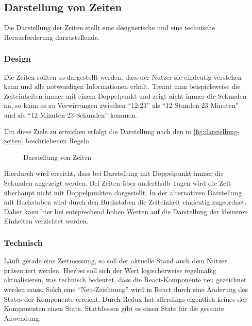 \newpage

\subsection{Darstellung von Zeiten}
Die Darstellung der Zeiten stellt eine designerische und eine technische Herausforderung darzustellende.

\subsubsection{Design}
Die Zeiten sollten so dargestellt werden,
dass der Nutzer sie eindeutig verstehen kann und alle notwendigen Informationen erhält.
Trennt man beispielsweise die Zeiteinheiten immer mit einem Doppelpunkt und zeigt nicht immer die Sekunden an,
so kann es zu Verwirrungen zwischen \enquote{12:23} als \enquote{12 Stunden 23 Minuten}
und als \enquote{12 Minuten 23 Sekunden} kommen.

Um diese Ziele zu erreichen erfolgt die Darstellung nach den in \autoref{fig:darstellung-zeiten} beschriebenen Regeln.

\begin{figure}[ht!]
    \centering
    \resizebox{\textwidth}{!}{
        
    }
    \caption{Darstellung von Zeiten}
    \label{fig:darstellung-zeiten}
\end{figure}


Hierdurch wird erreicht, dass bei Darstellung mit Doppelpunkt immer die Sekunden angezeigt werden.
Bei Zeiten über anderthalb Tagen wird die Zeit überhaupt nicht mit Doppelpunkten dargestellt.
In der alternativen Darstellung mit Buchstaben wird durch den Buchstaben die Zeiteinheit eindeutig zugeordnet.
Daher kann hier bei entsprechend hohen Werten auf die Darstellung der kleineren Einheiten verzichtet werden.

\subsubsection{Technisch}
Läuft gerade eine Zeitmessung, so soll der aktuelle Stand auch dem Nutzer präsentiert werden.
Hierbei soll sich der Wert logischerweise regelmäßig aktualisieren,
was technisch bedeutet, dass die React-Komponente neu gezeichnet werden muss.
Solch eine \enquote{Neu-Zeichnung} wird in React durch eine Änderung des States der Komponente erreicht.
Durch Redux hat allerdings eigentlich keines der Komponenten einen State.
Stattdessen gibt es einen State für die gesamte Anwendung.

